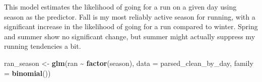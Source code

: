 \documentclass[
  11pt,
]{article}
\newenvironment{Shaded}{\begin{snugshade}}{\end{snugshade}}
\newcommand{\AttributeTok}[1]{\textcolor[rgb]{0.13,0.29,0.53}{#1}}
\newcommand{\FunctionTok}[1]{\textcolor[rgb]{0.13,0.29,0.53}{\textbf{#1}}}
\newcommand{\NormalTok}[1]{#1}
\newcommand{\OtherTok}[1]{\textcolor[rgb]{0.56,0.35,0.01}{#1}}
\newcommand{\SpecialCharTok}[1]{\textcolor[rgb]{0.81,0.36,0.00}{\textbf{#1}}}
\begin{document}
This model estimates the likelihood of going for a run on a given day
using season as the predictor. Fall is my most reliably active season
for running, with a significant increase in the likelihood of going for
a run compared to winter. Spring and summer show no significant change,
but summer might actually suppress my running tendencies a bit.

\begin{Shaded}
\begin{Highlighting}[]
\NormalTok{ran\_season }\OtherTok{\textless{}{-}} \FunctionTok{glm}\NormalTok{(ran }\SpecialCharTok{\textasciitilde{}} \FunctionTok{factor}\NormalTok{(season), }\AttributeTok{data =}\NormalTok{ parsed\_clean\_by\_day, }\AttributeTok{family =} \FunctionTok{binomial}\NormalTok{())}
\end{Highlighting}
\end{Shaded}
\end{document}
